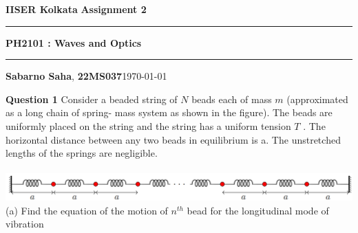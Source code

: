 \documentclass[addpoints]{exam}
\begin{document}
\par\textbf{IISER Kolkata} \hfill \textbf{Assignment 2}
\vspace{3pt}
\hrule
\vspace{3pt}
\begin{center}
        \LARGE{\textbf{PH2101 : Waves and Optics}}
\end{center}
\vspace{3pt}
\hrule
\vspace{4pt}
\textbf{Sabarno Saha}, \textbf{22MS037}\hfill \today\vspace{20pt}
\bigskip

\begin{questions}
\question 
\textbf{Question 1}
Consider a beaded string of $N$ beads each of mass $m$ (approximated as a long chain of spring-
mass system as shown in the figure). The beads are uniformly placed on the string and the
string has a uniform tension $T$ . The horizontal distance between any two beads in equilibrium
is a. The unstretched lengths of the springs are negligible.\\ \\ 
\includegraphics[width = 6.0in]{q1.png}\\ 
(a) Find the equation of the motion of $n^{th}$ bead for the longitudinal mode of vibration
\begin{solution}
    



\begin{center}
    
\begin{tikzpicture}[x=0.75pt,y=0.75pt,yscale=-1,xscale=1]


\end{tikzpicture}
\end{center}
\end{solution}
\end{questions}
\end{document}
